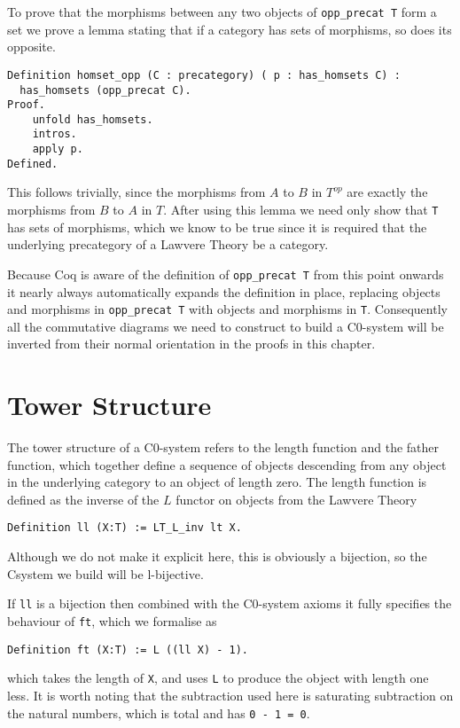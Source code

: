 To prove that the morphisms between any two objects of \lstinline|opp_precat T|
form a set we prove a lemma stating that if a category has sets of morphisms, so
does its opposite.
\begin{lstlisting}
Definition homset_opp (C : precategory) ( p : has_homsets C) :
  has_homsets (opp_precat C).
Proof.
    unfold has_homsets.
    intros.
    apply p.
Defined.
\end{lstlisting}
This follows trivially, since the morphisms from $A$ to $B$ in $T^{op}$ are
exactly the morphisms from $B$ to $A$ in $T$. After using this lemma we need
only show that \lstinline|T| has sets of morphisms, which we know to be true since it
is required that the underlying precategory of a Lawvere Theory be a category.

Because Coq is aware of the definition of \lstinline|opp_precat T| from this point
onwards it nearly always automatically expands the definition in place,
replacing objects and morphisms in \lstinline|opp_precat T| with objects and
morphisms in \lstinline|T|. Consequently all the commutative diagrams we need to
construct to build a C0-system will be inverted from their normal orientation in
the proofs in this chapter.

\section{Tower Structure}
The tower structure of a C0-system refers to the length function and the father
function, which together define a sequence of objects descending from any object
in the underlying category to an object of length zero. The length function is
defined as the inverse of the $L$ functor on objects from the Lawvere Theory
\begin{lstlisting}
Definition ll (X:T) := LT_L_inv lt X.
\end{lstlisting}

Although we do not make it explicit here, this is obviously a bijection, so the
Csystem we build will be l-bijective.

If \lstinline|ll| is a bijection then combined with the C0-system axioms it fully
specifies the behaviour of \lstinline|ft|, which we formalise as
\begin{lstlisting}
Definition ft (X:T) := L ((ll X) - 1).
\end{lstlisting}
which takes the length of \lstinline|X|, and uses \lstinline|L| to produce the object with
length one less. It is worth noting that the subtraction used here is saturating
subtraction on the natural numbers, which is total and has \lstinline|0 - 1 = 0|.

